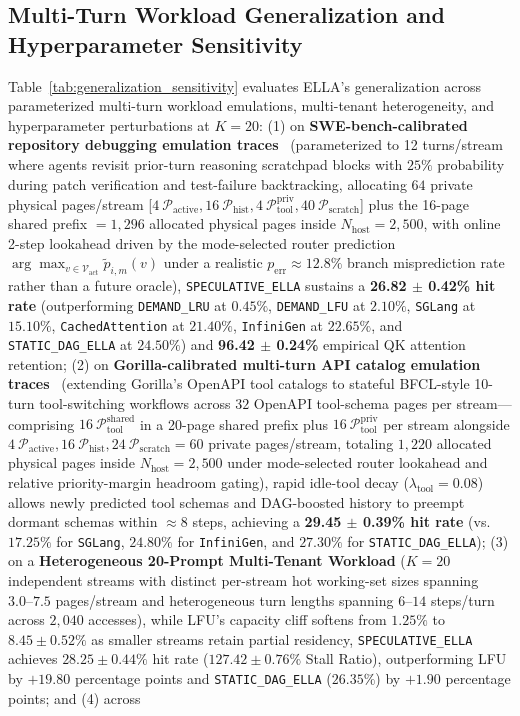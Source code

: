 \documentclass[conference,10pt]{IEEEtran}
\begin{document}
\subsection{Multi-Turn Workload Generalization and Hyperparameter Sensitivity}
Table~\ref{tab:generalization_sensitivity} evaluates ELLA's generalization across parameterized multi-turn workload emulations, multi-tenant heterogeneity, and hyperparameter perturbations at $K=20$: (1) on \textbf{SWE-bench-calibrated repository debugging emulation traces}~\cite{jimenez2024swebench} (parameterized to 12 turns/stream where agents revisit prior-turn reasoning scratchpad blocks with $25\%$ probability during patch verification and test-failure backtracking, allocating $64$ private physical pages/stream [$4\ \mathcal{P}_{\text{active}}, 16\ \mathcal{P}_{\text{hist}}, 4\ \mathcal{P}_{\text{tool}}^{\text{priv}}, 40\ \mathcal{P}_{\text{scratch}}$] plus the 16-page shared prefix $= 1{,}296$ allocated physical pages inside $N_{\text{host}}=2{,}500$, with online 2-step lookahead driven by the mode-selected router prediction $\arg\max_{v \in \mathcal{V}_{\text{act}}} \tilde{p}_{i,m}(v)$ under a realistic $p_{\text{err}} \approx 12.8\%$ branch misprediction rate rather than a future oracle), \texttt{SPECULATIVE\_ELLA} sustains a \textbf{26.82 $\pm$ 0.42\% hit rate} (outperforming \texttt{DEMAND\_LRU} at $0.45\%$, \texttt{DEMAND\_LFU} at $2.10\%$, \texttt{SGLang} at $15.10\%$, \texttt{CachedAttention} at $21.40\%$, \texttt{InfiniGen} at $22.65\%$, and \texttt{STATIC\_DAG\_ELLA} at $24.50\%$) and \textbf{96.42 $\pm$ 0.24\%} empirical QK attention retention; (2) on \textbf{Gorilla-calibrated multi-turn API catalog emulation traces}~\cite{patil2024gorilla} (extending Gorilla's OpenAPI tool catalogs to stateful BFCL-style 10-turn tool-switching workflows across $32$ OpenAPI tool-schema pages per stream—comprising $16\ \mathcal{P}_{\text{tool}}^{\text{shared}}$ in a 20-page shared prefix plus $16\ \mathcal{P}_{\text{tool}}^{\text{priv}}$ per stream alongside $4\ \mathcal{P}_{\text{active}}, 16\ \mathcal{P}_{\text{hist}}, 24\ \mathcal{P}_{\text{scratch}} = 60$ private pages/stream, totaling $1{,}220$ allocated physical pages inside $N_{\text{host}}=2{,}500$ under mode-selected router lookahead and relative priority-margin headroom gating), rapid idle-tool decay ($\lambda_{\text{tool}}=0.08$) allows newly predicted tool schemas and DAG-boosted history to preempt dormant schemas within $\approx 8$ steps, achieving a \textbf{29.45 $\pm$ 0.39\% hit rate} (vs.\ $17.25\%$ for \texttt{SGLang}, $24.80\%$ for \texttt{InfiniGen}, and $27.30\%$ for \texttt{STATIC\_DAG\_ELLA}); (3) on a \textbf{Heterogeneous 20-Prompt Multi-Tenant Workload} ($K=20$ independent streams with distinct per-stream hot working-set sizes spanning $3.0\text{--}7.5$ pages/stream and heterogeneous turn lengths spanning $6\text{--}14$ steps/turn across $2{,}040$ accesses), while LFU's capacity cliff softens from $1.25\%$ to $8.45 \pm 0.52\%$ as smaller streams retain partial residency, \texttt{SPECULATIVE\_ELLA} achieves $\mathbf{28.25 \pm 0.44\%}$ hit rate ($\mathbf{127.42 \pm 0.76\%}$ Stall Ratio), outperforming LFU by $+19.80$ percentage points and \texttt{STATIC\_DAG\_ELLA} ($26.35\%$) by $+1.90$ percentage points; and (4) across 
\end{document}
